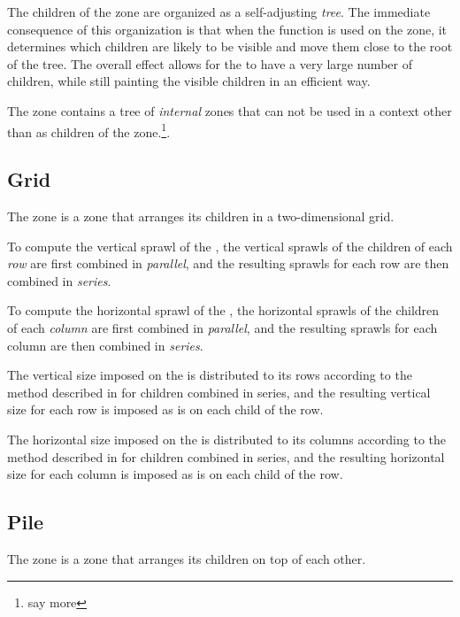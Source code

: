 The children of the  zone are organized as a
self-adjusting \emph{tree}.  The immediate consequence of this
organization is that when the function  is used on
the  zone, it determines which children are likely to be
visible and move them close to the root of the tree.  The overall
effect allows for the  to have a very large number of
children, while still painting the visible children in an efficient
way. 

The  zone contains a tree of \emph{internal} zones that
can not be used in a context other than as children of the
 zone.\footnote{say more}.

\subsection{Grid}
\label{sec-zones-layout-grid}

The  zone is a zone that arranges its children in a
two-dimensional grid.  

To compute the vertical sprawl of the , the vertical
sprawls of the children of each \emph{row} are first combined in
\emph{parallel}, and the resulting sprawls for each row are then
combined in \emph{series}.  

To compute the horizontal sprawl of the , the horizontal
sprawls of the children of each \emph{column} are first combined in
\emph{parallel}, and the resulting sprawls for each column are then
combined in \emph{series}.

The vertical size imposed on the  is distributed to its
rows according to the method described in
 for children combined in
series, and the resulting vertical size for each row is imposed as is
on each child of the row.

The horizontal size imposed on the  is distributed to its
columns according to the method described in
 for children combined in
series, and the resulting horizontal size for each column is imposed
as is on each child of the row.

\subsection{Pile}
\label{sec-zones-layout-pile}

The  zone is a zone that arranges its children on top of
each other.

